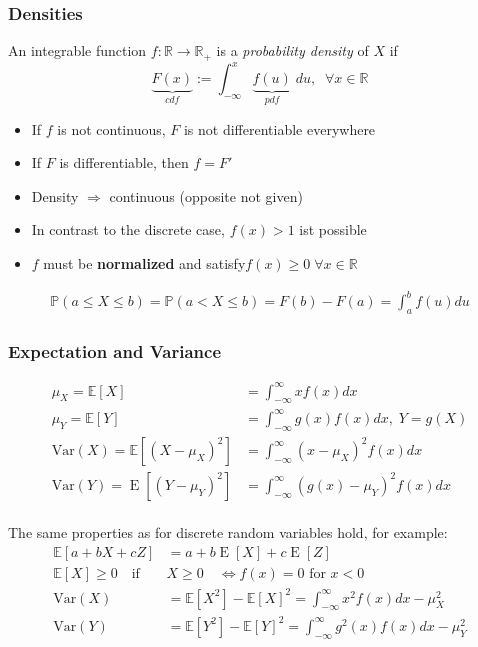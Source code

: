 \subsubsection{Densities}
An integrable function $f:\mathbb{R}\rightarrow\mathbb{R}_+$ is a \textit{probability density} of $X$ if
\noindent\begin{equation*}
    \underbrace{F(x)}_{cdf} := \int_{-\infty}^{x} \underbrace{f(u)}_{pdf}\; du,\;\; \forall x\in \mathbb{R}
\end{equation*}
\begin{itemize}
    \item If $f$ is not continuous, $F$ is not differentiable everywhere
    \item If $F$ is differentiable, then $f = F'$
    \item Density $\Rightarrow$ continuous (opposite not given)
    \item In contrast to the discrete case, $f(x)>1$ ist possible
    \item $f$ must be \textbf{normalized} and satisfy\newline $f(x)\geq 0 \; \forall x\in\mathbb{R}$
\end{itemize}
\noindent\begin{align*}
    \mathbb{P}(a\leq X\leq b)=\mathbb{P}(a<X\leq b)=F(b)-F(a)=\int_a^b f(u)du
\end{align*}
\subsubsection{Expectation and Variance}
\noindent\begin{align*}
    \mu_X=\mathbb{E}[X]                                 & =\int_{-\infty}^{\infty}xf(x)dx                               \\
    \mu_Y=\mathbb{E}[Y]                                 & =\int_{-\infty}^{\infty}g(x)f(x)dx,\;Y=g(X)                   \\
    \mathrm{Var}(X)=\mathbb{E}[{(X-\mu_{X})}^{2}]       & =\int_{-\infty}^{\infty}{(x-\mu_{X})}^{2}f(x)dx               \\
    \mathrm{Var}(Y)=\operatorname{E}[{(Y-\mu_{Y})}^{2}] & =\int_{-\infty}^{\infty}{\left(g(x)-\mu_{Y}\right)}^{2}f(x)dx
\end{align*}
\\
The same properties as for discrete random variables hold, for example:
\noindent\begin{align*}
    \mathbb{E}[a+bX+cZ]               & =a+b\operatorname{E}[X]+c\operatorname{E}[Z]                                             \\
    \mathbb{E}[X]\geq0\quad\text{if } & X\geq0\quad\Leftrightarrow f(x) = 0 \text{ for } x<0                                     \\
    \mathrm{Var}(X)                   & =\mathbb{E}[X^{2}]-{\mathbb{E}[X]}^{2}=\int_{-\infty}^{\infty}x^{2}f(x)dx-\mu_{X}^{2}    \\
    \mathrm{Var}(Y)                   & =\mathbb{E}[Y^{2}]-{\mathbb{E}[Y]}^{2}=\int_{-\infty}^{\infty}g^{2}(x)f(x)dx-\mu_{Y}^{2}
\end{align*}

